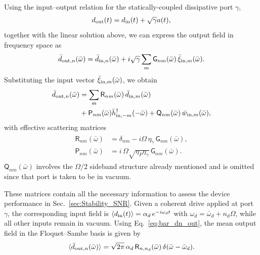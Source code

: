 \documentclass[a4paper,twocolumn,floatfix,10pt,superscriptaddress]%
{quantumarticle}
\newcommand{\msf}[1]{\mathsf{#1}}
\newcommand{\bomega}{{\bar{\omega}}}
\newcommand{\msG}{{\msf{G}}}
\newcommand{\rmout}{{{\rm out}}}
\newcommand{\rmin}{{{\rm in}}}
\begin{document}
Using the input–output relation for the statically-coupled dissipative port $\gamma$, \begin{align}
    d_{\rmout}(t)=d_{\rmin}(t)+\sqrt{\gamma} a(t),
\end{align} together with the linear solution above, we can express the output field in frequency space as 
\begin{align}
    \bar{d}_{\rmout,n}(\bomega) 
= \bar{d}_{\rmin,n}(\bomega) 
+ i \sqrt{\gamma} \sum_m \msf{G}_{n m}(\bomega)\, \bar{\xi}_{\rmin,m}(\bomega).\nonumber
\end{align}
Substituting the input vector $\bar{\xi}_{\rmin,m}(\bomega)$, we obtain
\begin{align}
\bar{d}_{\rmout,n}(\bomega) 
&= \sum_m \msf{R}_{n m}(\bomega)\, \bar{d}_{\rmin,m}(\bomega)\label{eq:bar_dn_out}
\\&+\msf{P}_{nm}(\bomega) \bar{h}_{\rmin,-m}^\dag(-\bomega)+ \msf{Q}_{n m}(\bomega)\, \bar{w}_{\rmin,m}(\bomega),\nonumber
\end{align}
with effective scattering matrices
\begin{align}\label{eqs:R_nm_P_nm}
\begin{aligned}
    \msf{R}_{n m}(\bar\omega) &= \delta_{n m} - i \Omega\,\eta_{\gamma}\,\msG_{n m}(\bar\omega),\\
\msf{P}_{n m}(\bar\omega) &= i\,\Omega\sqrt{\eta_{P}\eta_{\gamma}}\,\msf{G}_{n m}(\bar\omega).
\end{aligned}
\end{align}
$\msf{Q}_{n m}(\bomega)$ involves the $\Omega/2$ sideband structure already mentioned and is omitted since that port is taken to be in vacuum.

These matrices contain all the necessary information to  assess the device performance in Sec.~\ref{sec:Stability_SNR}. Given a coherent drive applied at port $\gamma$, the corresponding input field is $\langle d_{\rm in}(t) \rangle = \alpha_d\, e^{-i\omega_d t}$ with $\omega_d = \bar{\omega}_d + n_d \Omega$, while all other inputs remain in vacuum. Using Eq.~\eqref{eq:bar_dn_out}, the mean output field in the Floquet--Sambe basis is given by 
\begin{eqnarray}
    \langle \bar{d}_{{\rm out}, n}(\bar{\omega}) \rangle = \sqrt{2\pi}\, \alpha_d\, \mathsf{R}_{n,n_d}(\bar{\omega})\, \delta(\bar{\omega}-\bar{\omega}_d).
\end{eqnarray}
\end{document}
